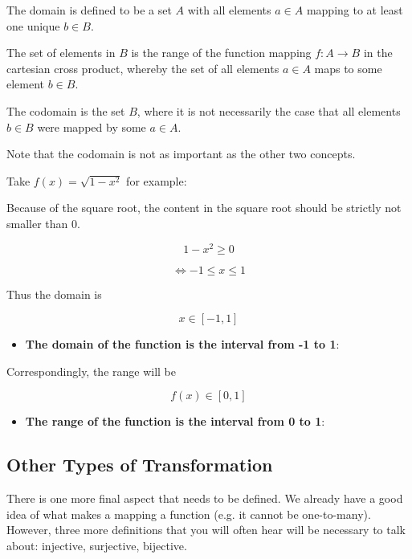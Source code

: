 The domain is defined to be a set $A$ with all elements $a \in A$ mapping to at least one unique $b \in B$.

The set of elements in $B$ is the range of the function mapping $f:A \to B$ in the cartesian cross product, whereby the set of all elements $a \in A$ maps to some element $b \in B$.

The codomain is the set $B$, where it is not necessarily the case that all elements $b \in B$ were mapped by some $a \in A$.

Note that the codomain is not as important as the other two concepts.

Take $f(x) = \sqrt{1 - x^2}$ for example:

Because of the square root, the content in the square root should be strictly not smaller
than 0.

  \[
1 - x^2 \geq 0
\]

  \[
\Leftrightarrow -1 \leq x \leq 1
\]

Thus the domain is

  \[
x \in [-1, 1]
\]

\begin{itemize}
    \item \textbf{The domain of the function is the interval from -1 to 1}:
\end{itemize}

Correspondingly, the range will be

  \[
f(x) \in [0, 1]
\]

\begin{itemize}
    \item \textbf{The range of the function is the interval from 0 to 1}:
\end{itemize}

\subsection{Other Types of Transformation}
\label{sss:othe-065a}

There is one more final aspect that needs to be defined. We already have a good idea of
what makes a mapping a function (e.g. it cannot be one-to-many). However, three more
definitions that you will often hear will be necessary to talk about: injective,
surjective, bijective.


